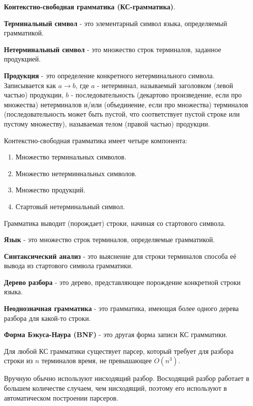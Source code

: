 \documentclass[oneside]{book}
\begin{document}
    \textbf{Контекстно-свободная грамматика (КС-грамматика)}.

    \textbf{Терминальный символ} - это элементарный символ языка,
    определяемый грамматикой.

    \textbf{Нетерминальный символ} - это множество строк терминалов,
    заданное продукцией.

    \textbf{Продукция} - это определение конкретного нетерминального символа.
    Записывается как $ a \rightarrow b $,
    где $ a $ - нетерминал, называемый заголовком
    (левой частью) продукции, $ b $ - последовательность
    (декартово произведение, если про множества)
    нетерминалов и/или (объединение, если про множества) терминалов
    (последовательность может быть пустой, что соответствует пустой строке или
    пустому множеству), называемая телом (правой частью) продукции.

    Контекстно-свободная грамматика имеет четыре компонента:
    \begin{enumerate}
        \item Множество терминальных символов.
        \item Множество нетерминнальных символов.
        \item Множество продукций.
        \item Стартовый нетерминальный символ.
    \end{enumerate}

    Грамматика выводит (порождает) строки, начиная со стартового символа.

    \textbf{Язык} - это множество строк терминалов, определяемые грамматикой.

    \textbf{Синтаксический анализ} - это выяснение для строки терминалов
    способа её вывода из стартового символа грамматики.

    \textbf{Дерево разбора} - это дерево, представляющее
    порождение конкретной строки языка.

    \textbf{Неоднозначная грамматика} - это грамматика,
    имеющая более одного дерева разбора для какой-то строки.

    \textbf{Форма Бэкуса-Наура (BNF)} - это другая форма записи КС грамматики.

    Для любой КС грамматики существует парсер, который требует для разбора
    строки из $ n $ терминалов время, не превышающее $ O\left(n^3\right) $.

    Вручную обычно используют нисходящий разбор.
    Восходящий разбор работает в большем количестве случаем, чем нисходящий,
    поэтому его используют в автоматическом построении парсеров.
\end{document}
